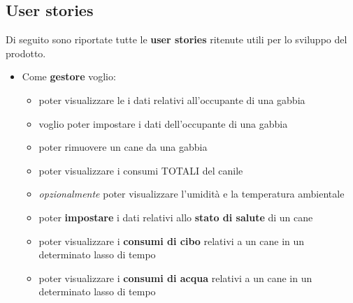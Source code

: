         \subsection{User stories}
        Di seguito sono riportate tutte le \textbf{user stories} ritenute utili per lo sviluppo del prodotto.
        \begin{itemize}
            \item Come \textbf{gestore}
            voglio:
            \begin{itemize}
                \item poter visualizzare le i dati relativi all’occupante di una gabbia
                \item voglio poter impostare i dati dell’occupante di una gabbia
                \item poter rimuovere un cane da una gabbia
                \item poter visualizzare i consumi TOTALI del canile
                \item \textit{opzionalmente} poter visualizzare l’umidità e la temperatura ambientale 
                \item poter \textbf{impostare} i dati relativi allo \textbf{stato di salute} di un cane
                \item poter visualizzare i \textbf{consumi di cibo} relativi a un cane in un determinato lasso di tempo
                \item poter visualizzare i \textbf{consumi di acqua} relativi a un cane in un determinato lasso di tempo
            \end{itemize}
            

\end{itemize}

